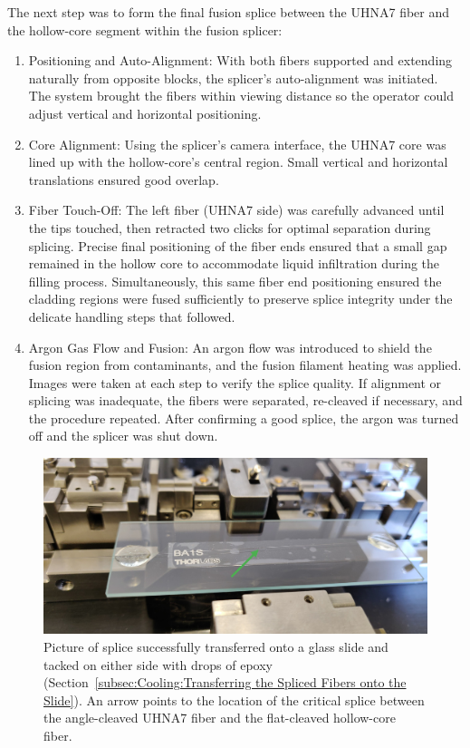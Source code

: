 The next step was to form the final fusion splice between the \ac{UHNA7} fiber and the hollow-core segment within the fusion splicer:

\begin{enumerate}
	\item Positioning and Auto-Alignment: With both fibers supported and extending naturally from opposite blocks, the splicer’s auto-alignment was initiated. The system brought the fibers within viewing distance so the operator could adjust vertical and horizontal positioning.
	\item Core Alignment: Using the splicer’s camera interface, the UHNA7 core was lined up with the hollow-core’s central region. Small vertical and horizontal translations ensured good overlap.
	\item Fiber Touch-Off: The left fiber (\ac{UHNA7} side) was carefully advanced until the tips touched, then retracted two clicks for optimal separation during splicing. Precise final positioning of the fiber ends ensured that a small gap remained in the hollow core to accommodate liquid infiltration during the filling process. Simultaneously, this same fiber end positioning ensured the cladding regions were fused sufficiently to preserve splice integrity under the delicate handling steps that followed.
	\item Argon Gas Flow and Fusion: An argon flow was introduced to shield the fusion region from contaminants, and the fusion filament heating was applied. Images were taken at each step to verify the splice quality. If alignment or splicing was inadequate, the fibers were separated, re-cleaved if necessary, and the procedure repeated. After confirming a good splice, the argon was turned off and the splicer was shut down.
\end{enumerate}

\begin{figure}[t]
  \centering
  \includegraphics[width=\textwidth]{figs/3-Cooling/tackedSpliceWithArrow.jpg}
  \caption{Picture of splice successfully transferred onto a glass slide and tacked on either side with drops of epoxy (Section~\ref{subsec:Cooling:Transferring the Spliced Fibers onto the Slide}). An arrow points to the location of the critical splice between the angle-cleaved \ac{UHNA7} fiber and the flat-cleaved hollow-core fiber.}
  \label{fig:tacked splice with arrow}
\end{figure}

